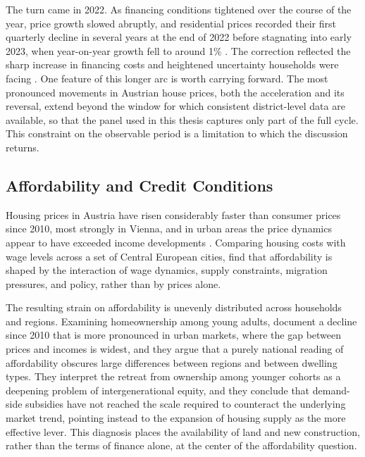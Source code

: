 \documentclass[a4paper,12pt, headsepline]{scrartcl}
\numberwithin{equation}{section}
\begin{document}
The turn came in 2022. As financing conditions tightened over the course of the year, price growth slowed abruptly, and residential prices recorded their first quarterly decline in several years at the end of 2022 before stagnating into early 2023, when year-on-year growth fell to around 1\% \citep{hildebrandt2023}. The correction reflected the sharp increase in financing costs and heightened uncertainty households were facing \citep{hildebrandt2023}. One feature of this longer arc is worth carrying forward. The most pronounced movements in Austrian house prices, both the acceleration and its reversal, extend beyond the window for which consistent district-level data are available, so that the panel used in this thesis captures only part of the full cycle. This constraint on the observable period is a limitation to which the discussion returns.

\subsection{Affordability and Credit Conditions}\label{subsec:affordability-credit}

Housing prices in Austria have risen considerably faster than consumer prices since 2010, most strongly in Vienna, and in urban areas the price dynamics appear to have exceeded income developments \citep{mundt2024}. Comparing housing costs with wage levels across a set of Central European cities, \citet{matejkova2025} find that affordability is shaped by the interaction of wage dynamics, supply constraints, migration pressures, and policy, rather than by prices alone.

The resulting strain on affordability is unevenly distributed across households and regions. Examining homeownership among young adults, \citet{mundt2024} document a decline since 2010 that is more pronounced in urban markets, where the gap between prices and incomes is widest, and they argue that a purely national reading of affordability obscures large differences between regions and between dwelling types. They interpret the retreat from ownership among younger cohorts as a deepening problem of intergenerational equity, and they conclude that demand-side subsidies have not reached the scale required to counteract the underlying market trend, pointing instead to the expansion of housing supply as the more effective lever. This diagnosis places the availability of land and new construction, rather than the terms of finance alone, at the center of the affordability question.
\end{document}
